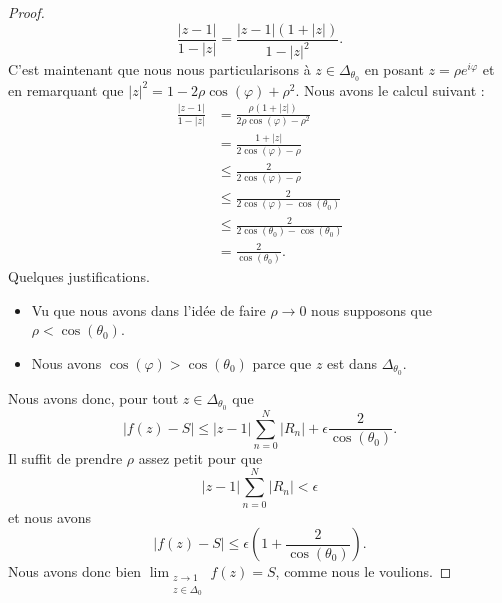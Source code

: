 \begin{proof}
	\begin{equation}
		\frac{ | z-1 | }{ 1-| z | }=\frac{ | z-1 |(1+| z |) }{ 1-| z |^2 }.
	\end{equation}
	C'est maintenant que nous nous particularisons à \( z\in\Delta_{\theta_0}\) en posant \( z=\rho e^{i\varphi}\) et en remarquant que \( | z |^2=1-2\rho\cos(\varphi)+\rho^2\). Nous avons le calcul suivant :
	\begin{subequations}
		\begin{align}
			\frac{ | z-1 | }{ 1-| z | } & =\frac{ \rho(1+| z |) }{ 2\rho\cos(\varphi)-\rho^2 } \\
			                            & =\frac{ 1+| z | }{ 2\cos(\varphi)-\rho}              \\
			                            & \leq\frac{ 2 }{ 2\cos(\varphi)-\rho }                \\
			                            & \leq\frac{ 2 }{ 2\cos(\varphi)-\cos(\theta_0) }      \\
			                            & \leq\frac{ 2 }{ 2\cos(\theta_0)-\cos(\theta_0) }     \\
			                            & =\frac{ 2 }{ \cos(\theta_0) }.
		\end{align}
	\end{subequations}
	Quelques justifications.
	\begin{itemize}
		\item Vu que nous avons dans l'idée de faire \( \rho\to 0\) nous supposons que \( \rho<\cos(\theta_0)\).
		\item Nous avons \( \cos(\varphi)>\cos(\theta_0)\) parce que \( z\) est dans \( \Delta_{\theta_0}\).
	\end{itemize}
	Nous avons donc, pour tout \( z\in\Delta_{\theta_0}\) que
	\begin{equation}
		| f(z)-S |\leq | z-1 |\sum_{n=0}^N| R_n |+\epsilon\frac{ 2 }{ \cos(\theta_0) }.
	\end{equation}
	Il suffit de prendre \( \rho\) assez petit pour que
	\begin{equation}
		| z-1 |\sum_{n=0}^N| R_n |<\epsilon
	\end{equation}
	et nous avons
	\begin{equation}
		| f(z)-S |\leq \epsilon\left( 1+\frac{ 2 }{ \cos(\theta_0) } \right).
	\end{equation}
	Nous avons donc bien \( \lim_{\substack{z\to 1\\z\in\Delta_0}}f(z)=S\), comme nous le voulions.
\end{proof}


